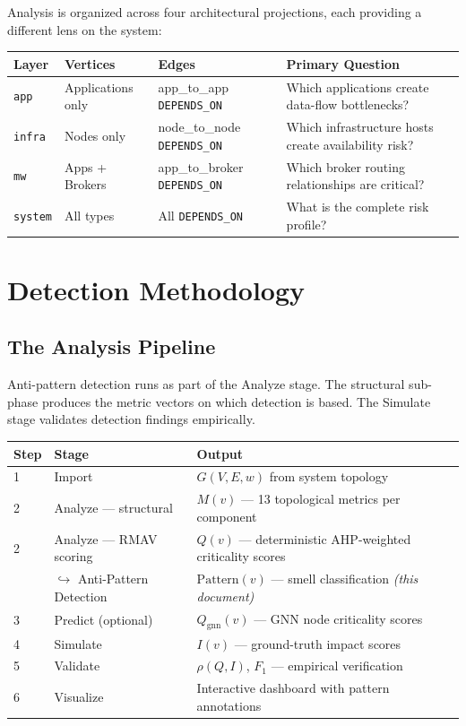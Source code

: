 \documentclass[11pt]{article}
\begin{document}
Analysis is organized across four architectural projections, each providing a different lens on the system:

\begin{center}
\begin{tabular}{@{}lllp{5cm}@{}}
\toprule
\textbf{Layer} & \textbf{Vertices} & \textbf{Edges} & \textbf{Primary Question} \\
\midrule
\texttt{app} & Applications only & app\_to\_app \texttt{DEPENDS\_ON} & Which applications create data-flow bottlenecks? \\
\texttt{infra} & Nodes only & node\_to\_node \texttt{DEPENDS\_ON} & Which infrastructure hosts create availability risk? \\
\texttt{mw} & Apps + Brokers & app\_to\_broker \texttt{DEPENDS\_ON} & Which broker routing relationships are critical? \\
\texttt{system} & All types & All \texttt{DEPENDS\_ON} & What is the complete risk profile? \\
\bottomrule
\end{tabular}
\end{center}

\section{Detection Methodology}

\subsection{The Analysis Pipeline}

Anti-pattern detection runs as part of the Analyze stage. The structural sub-phase produces the metric vectors on which detection is based. The Simulate stage validates detection findings empirically.

\begin{center}
\begin{tabular}{@{}lll@{}}
\toprule
\textbf{Step} & \textbf{Stage} & \textbf{Output} \\
\midrule
1 & Import & $G(V,E,w)$ from system topology \\
2 & Analyze --- structural & $M(v)$ --- 13 topological metrics per component \\
2 & Analyze --- RMAV scoring & $Q(v)$ --- deterministic AHP-weighted criticality scores \\
 & \quad $\hookrightarrow$ Anti-Pattern Detection & $\mathrm{Pattern}(v)$ --- smell classification \emph{(this document)} \\
3 & Predict (optional) & $Q_{\text{gnn}}(v)$ --- GNN node criticality scores \\
4 & Simulate & $I(v)$ --- ground-truth impact scores \\
5 & Validate & $\rho(Q,I)$, $F_1$ --- empirical verification \\
6 & Visualize & Interactive dashboard with pattern annotations \\
\bottomrule
\end{tabular}
\end{center}
\end{document}
